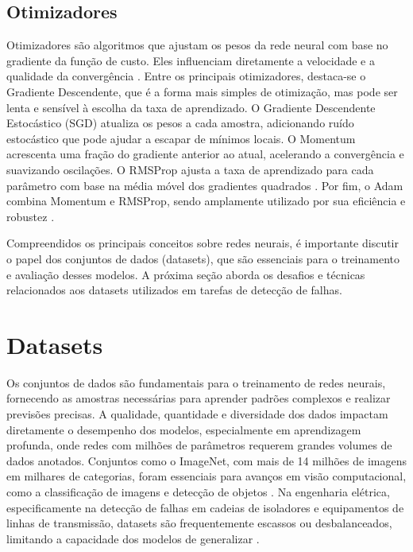 \subsection{Otimizadores}

Otimizadores são algoritmos que ajustam os pesos da rede neural com base no gradiente da função de custo. Eles influenciam diretamente a velocidade e a qualidade da convergência \cite{ruder2016overview}. Entre os principais otimizadores, destaca-se o Gradiente Descendente, que é a forma mais simples de otimização, mas pode ser lenta e sensível à escolha da taxa de aprendizado. O Gradiente Descendente Estocástico (SGD) atualiza os pesos a cada amostra, adicionando ruído estocástico que pode ajudar a escapar de mínimos locais. O Momentum acrescenta uma fração do gradiente anterior ao atual, acelerando a convergência e suavizando oscilações. O RMSProp ajusta a taxa de aprendizado para cada parâmetro com base na média móvel dos gradientes quadrados \cite{tieleman2012lecture}. Por fim, o Adam combina Momentum e RMSProp, sendo amplamente utilizado por sua eficiência e robustez \cite{kingma2014adam}.

Compreendidos os principais conceitos sobre redes neurais, é importante discutir o papel dos conjuntos de dados (datasets), que são essenciais para o treinamento e avaliação desses modelos. A próxima seção aborda os desafios e técnicas relacionados aos datasets utilizados em tarefas de detecção de falhas.

\section{Datasets}

Os conjuntos de dados são fundamentais para o treinamento de redes neurais, fornecendo as amostras necessárias para aprender padrões complexos e realizar previsões precisas. A qualidade, quantidade e diversidade dos dados impactam diretamente o desempenho dos modelos, especialmente em aprendizagem profunda, onde redes com milhões de parâmetros requerem grandes volumes de dados anotados. Conjuntos como o ImageNet, com mais de 14 milhões de imagens em milhares de categorias, foram essenciais para avanços em visão computacional, como a classificação de imagens e detecção de objetos \cite{deng2009imagenet}. Na engenharia elétrica, especificamente na detecção de falhas em cadeias de isoladores e equipamentos de linhas de transmissão, datasets são frequentemente escassos ou desbalanceados, limitando a capacidade dos modelos de generalizar \cite{shorten2019survey}.

